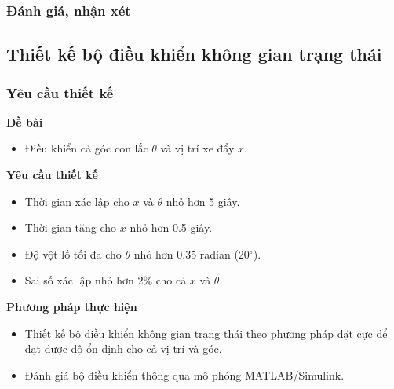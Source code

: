 \documentclass[12pt,a4paper]{article}
\begin{document}
\subsubsection{Đánh giá, nhận xét}

\subsection{Thiết kế bộ điều khiển không gian trạng thái}
\subsubsection{Yêu cầu thiết kế}
\begin{minipage}[t]{0.3\linewidth}
    \textbf{Đề bài}
\end{minipage}\begin{minipage}[t]{0.6\linewidth}
    \begin{itemize}
        \item Điều khiển cả góc con lắc $\theta$ và vị trí xe đẩy $x$.
    \end{itemize}
\end{minipage}

\vspace{\baselineskip}

\begin{minipage}[t]{0.3\linewidth}
    \textbf{Yêu cầu thiết kế}
\end{minipage}\begin{minipage}[t]{0.6\linewidth}
    \begin{itemize}[noitemsep,topsep=0pt]
        \item Thời gian xác lập cho $x$ và $\theta$ nhỏ hơn 5 giây.
        \item Thời gian tăng cho $x$ nhỏ hơn 0.5 giây. 
        \item Độ vột lố tối đa cho $\theta$ nhỏ hơn 0.35 radian (20$^\circ$). 
        \item Sai số xác lập nhỏ hơn 2\% cho cả $x$ và $\theta$. 
    \end{itemize}
\end{minipage}

\vspace{\baselineskip}

\begin{minipage}[t]{0.3\linewidth}
    \textbf{Phương pháp thực hiện}
\end{minipage}\begin{minipage}[t]{0.6\linewidth}
    \begin{itemize}[noitemsep,topsep=0pt]
        \item Thiết kế bộ điều khiển không gian trạng thái theo phương pháp đặt cực để đạt được độ ổn định cho cả vị trí và góc. 
        \item Đánh giá bộ điều khiển thông qua mô phỏng MATLAB/Simulink. 
    \end{itemize}
\end{minipage}
\end{document}
